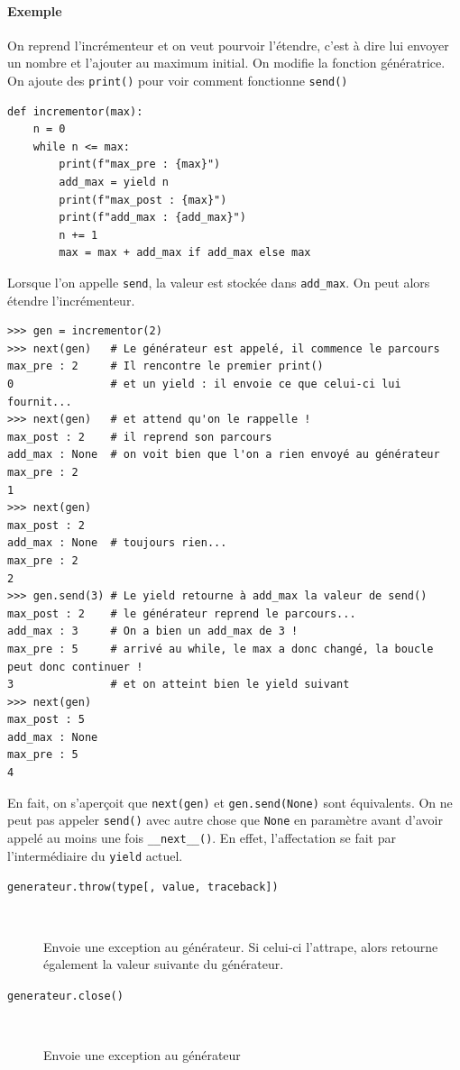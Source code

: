 \documentclass[a4paper, 10pt]{article}
\begin{document}
\paragraph{Exemple} On reprend l'incrémenteur et on veut pourvoir l'étendre, c'est à dire lui envoyer un nombre et l'ajouter au maximum initial. On modifie la fonction génératrice. On ajoute des \texttt{print()} pour voir comment fonctionne \texttt{send()}
\begin{verbatim}
def incrementor(max):
    n = 0
    while n <= max:
        print(f"max_pre : {max}")
        add_max = yield n
        print(f"max_post : {max}")
        print(f"add_max : {add_max}")
        n += 1
        max = max + add_max if add_max else max
\end{verbatim}
Lorsque l'on appelle \texttt{send}, la valeur est stockée dans \texttt{add_max}. On peut alors étendre l'incrémenteur.
\begin{verbatim}
>>> gen = incrementor(2)
>>> next(gen)   # Le générateur est appelé, il commence le parcours
max_pre : 2     # Il rencontre le premier print()
0               # et un yield : il envoie ce que celui-ci lui fournit...
>>> next(gen)   # et attend qu'on le rappelle !
max_post : 2    # il reprend son parcours
add_max : None  # on voit bien que l'on a rien envoyé au générateur
max_pre : 2
1
>>> next(gen)
max_post : 2
add_max : None  # toujours rien...
max_pre : 2
2
>>> gen.send(3) # Le yield retourne à add_max la valeur de send()
max_post : 2    # le générateur reprend le parcours...
add_max : 3     # On a bien un add_max de 3 !
max_pre : 5     # arrivé au while, le max a donc changé, la boucle peut donc continuer !
3               # et on atteint bien le yield suivant
>>> next(gen)
max_post : 5
add_max : None
max_pre : 5
4
\end{verbatim}
En fait, on s'aperçoit que \texttt{next(gen)} et \texttt{gen.send(None)} sont équivalents. On ne peut pas appeler \texttt{send()} avec autre chose que \texttt{None} en paramètre avant d'avoir appelé au moins une fois \texttt{__next__()}. En effet, l'affectation se fait par l'intermédiaire du \texttt{yield} actuel.

\begin{description}
    \item[\texttt{generateur.throw(type[, value, traceback])}]~

    Envoie une exception au générateur. Si celui-ci l'attrape, alors retourne également la valeur suivante du générateur.

    \item[\texttt{generateur.close()}]~

    Envoie une exception au générateur
\end{description}
\end{document}
